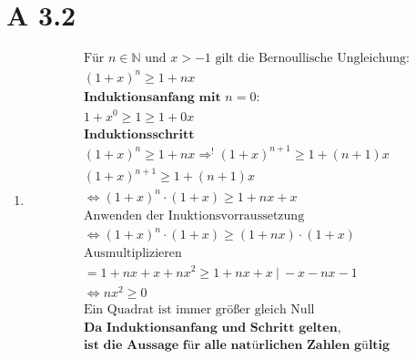 \documentclass{article}
\begin{document}
    \section*{A 3.2}
        \begin{enumerate}[label = (\alph*)]
            \item 
                \begin{gather*}
                    \text{Für } n \in \mathbb{N} \text{ und } x > -1 \text{ gilt die Bernoullische Ungleichung:} \\
                    {(1+x)}^n \geq 1 + nx \\
                    \textbf{Induktionsanfang mit } n=0: \\
                    {1+x}^0 \geq 1 \geq 1 + 0x \\
                    \textbf{Induktionsschritt} \\
                    {(1+x)}^n \geq 1 + nx \Rightarrow^! {(1+x)}^{n+1} \geq 1 + (n+1)x \\
                    {(1+x)}^{n+1} \geq 1 + (n+1)x \\
                    \Leftrightarrow {(1+x)}^{n}\cdot(1+x) \geq 1 + nx + x \\
                    \text{Anwenden der Inuktionsvorraussetzung} \\
                    \Leftrightarrow {(1+x)}^{n}\cdot(1+x) \geq (1 + nx)\cdot(1 + x) \\
                    \text{Ausmultiplizieren} \\
                    = 1 + nx + x + nx^2 \geq 1 + nx + x  \: | \: -x - nx - 1\\
                    \Leftrightarrow nx^2 \geq 0 \\
                    \text{Ein Quadrat ist immer größer gleich Null} \\
                    \textbf{Da Induktionsanfang und Schritt gelten,} \\
                    \textbf{ist die Aussage für alle natürlichen Zahlen gültig}
                \end{gather*}


\end{enumerate}
\end{document}
